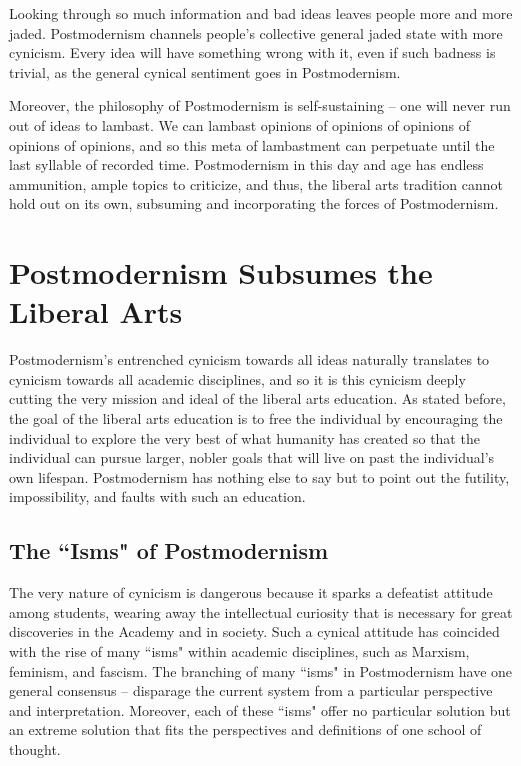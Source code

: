 \documentclass[12pt,letterpaper]{article}
\begin{document}
Looking through so much information and bad ideas leaves people more and more jaded.  Postmodernism channels people's collective general jaded state with more cynicism.  Every idea will have something wrong with it, even if such badness is trivial, as the general cynical sentiment goes in Postmodernism.  

Moreover, the philosophy of Postmodernism is self-sustaining -- one will never run out of ideas to lambast. We can lambast opinions of opinions of opinions of opinions of opinions, and so this meta of lambastment can perpetuate until the last syllable of recorded time.  Postmodernism in this day and age has endless ammunition, ample topics to criticize, and thus, the liberal arts tradition cannot hold out on its own, subsuming and incorporating the forces of Postmodernism.

%

\section{Postmodernism Subsumes the Liberal Arts}

Postmodernism's entrenched cynicism towards all ideas naturally translates to cynicism towards all academic disciplines, and so it is this cynicism deeply cutting the very mission and ideal of the liberal arts education.  As stated before, the goal of the liberal arts education is to free the individual by encouraging the individual to explore the very best of what humanity has created so that the individual can pursue larger, nobler goals that will live on past the individual's own lifespan.  Postmodernism has nothing else to say but to point out the futility, impossibility, and faults with such an education.

\subsection{The ``Isms" of Postmodernism}
The very nature of cynicism is dangerous because it sparks a defeatist attitude among students, wearing away the intellectual curiosity that is necessary for great discoveries in the Academy and in society.  Such a cynical attitude has coincided with the rise of many ``isms" within academic disciplines, such as Marxism, feminism, and fascism. The branching of many ``isms" in Postmodernism have one general consensus  -- disparage the current system from a particular perspective and interpretation.  Moreover, each of these ``isms" offer no particular solution but an extreme solution that fits the perspectives and definitions of one school of thought.
\end{document}
